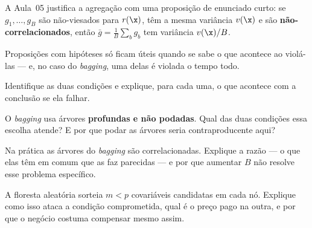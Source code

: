 A Aula~05 justifica a agregação com uma proposição de enunciado curto: se
$g_1,\dots,g_B$ são não-viesados para $r(\x)$, têm a mesma variância $v(\x)$ e são
\textbf{não-correlacionados}, então $\bar g=\frac1B\sum_b g_b$ tem variância
$v(\x)/B$.

Proposições com hipóteses só ficam úteis quando se sabe o que acontece ao violá-las
--- e, no caso do \emph{bagging}, uma delas é violada o tempo todo.
\begin{itens}
  \item {} Identifique as duas condições e explique, para cada uma, o que
        acontece com a conclusão se ela falhar.
  \item {} O \emph{bagging} usa árvores \textbf{profundas e não podadas}.
        Qual das duas condições essa escolha atende? E por que podar as árvores
        seria contraproducente aqui?
  \item {} Na prática as árvores do \emph{bagging} são correlacionadas.
        Explique a razão --- o que elas têm em comum que as faz parecidas --- e
        por que aumentar $B$ não resolve esse problema específico.
  \item {} A floresta aleatória sorteia $m<p$ covariáveis candidatas em
        cada nó. Explique como isso ataca a condição comprometida, qual é o preço
        pago na outra, e por que o negócio costuma compensar mesmo assim.
\end{itens}

